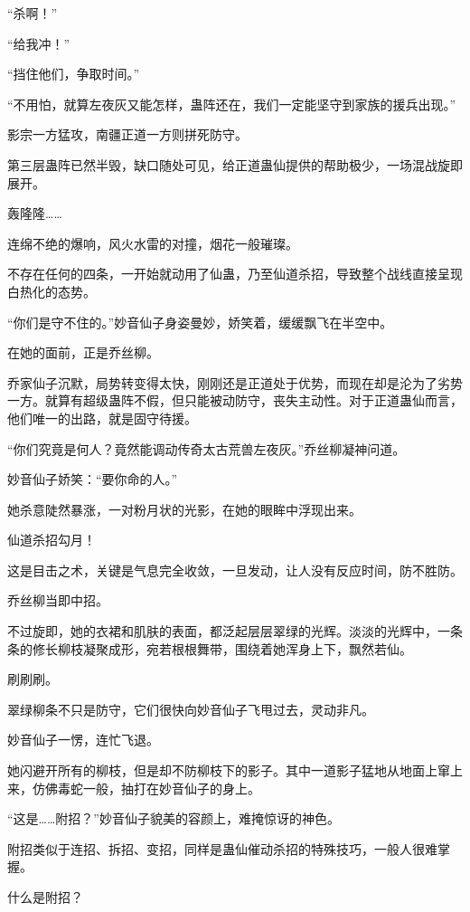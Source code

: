 
\begin{this_body}

“杀啊！”

“给我冲！”

“挡住他们，争取时间。”

“不用怕，就算左夜灰又能怎样，蛊阵还在，我们一定能坚守到家族的援兵出现。”

影宗一方猛攻，南疆正道一方则拼死防守。

第三层蛊阵已然半毁，缺口随处可见，给正道蛊仙提供的帮助极少，一场混战旋即展开。

轰隆隆……

连绵不绝的爆响，风火水雷的对撞，烟花一般璀璨。

不存在任何的四条，一开始就动用了仙蛊，乃至仙道杀招，导致整个战线直接呈现白热化的态势。

“你们是守不住的。”妙音仙子身姿曼妙，娇笑着，缓缓飘飞在半空中。

在她的面前，正是乔丝柳。

乔家仙子沉默，局势转变得太快，刚刚还是正道处于优势，而现在却是沦为了劣势一方。就算有超级蛊阵不假，但只能被动防守，丧失主动性。对于正道蛊仙而言，他们唯一的出路，就是固守待援。

“你们究竟是何人？竟然能调动传奇太古荒兽左夜灰。”乔丝柳凝神问道。

妙音仙子娇笑：“要你命的人。”

她杀意陡然暴涨，一对粉月状的光影，在她的眼眸中浮现出来。

仙道杀招勾月！

这是目击之术，关键是气息完全收敛，一旦发动，让人没有反应时间，防不胜防。

乔丝柳当即中招。

不过旋即，她的衣裙和肌肤的表面，都泛起层层翠绿的光辉。淡淡的光辉中，一条条的修长柳枝凝聚成形，宛若根根舞带，围绕着她浑身上下，飘然若仙。

刷刷刷。

翠绿柳条不只是防守，它们很快向妙音仙子飞甩过去，灵动非凡。

妙音仙子一愣，连忙飞退。

她闪避开所有的柳枝，但是却不防柳枝下的影子。其中一道影子猛地从地面上窜上来，仿佛毒蛇一般，抽打在妙音仙子的身上。

“这是……附招？”妙音仙子貌美的容颜上，难掩惊讶的神色。

附招类似于连招、拆招、变招，同样是蛊仙催动杀招的特殊技巧，一般人很难掌握。

什么是附招？


\end{this_body}
